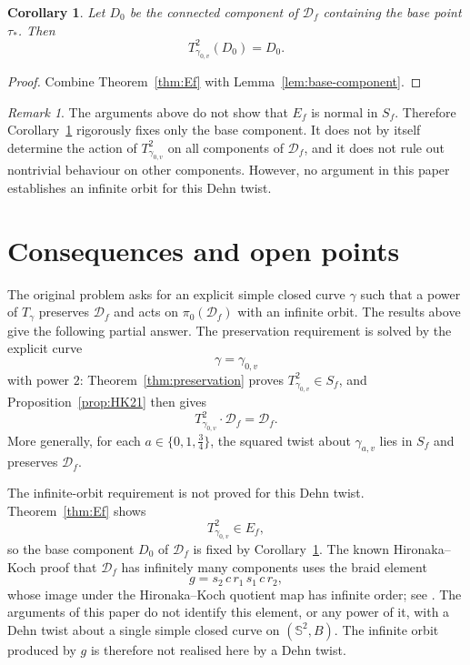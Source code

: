 \documentclass[12pt]{article}
\newtheorem{corollary}[theorem]{Corollary}
\theoremstyle{definition}
\theoremstyle{remark}
\newtheorem{remark}[theorem]{Remark}
\numberwithin{equation}{section}
\newcommand{\Sph}{\mathbb S}
\newcommand{\Df}{\mathcal D_f}
\newcommand{\Sf}{S_f}
\newcommand{\Ef}{E_f}
\begin{document}
\begin{corollary}
\label{cor:base-fixed}
Let $D_{0}$ be the connected component of $\Df$ containing the base
point $\tau_{*}$.  Then
\[
T_{\gamma_{0,v}}^{2}(D_{0})=D_{0}.
\]
\end{corollary}
\begin{proof}
Combine Theorem~\ref{thm:Ef} with Lemma~\ref{lem:base-component}.
\end{proof}

\begin{remark}
\label{rem:caveat}
The arguments above do not show that $\Ef$ is normal in $\Sf$.
Therefore Corollary~\ref{cor:base-fixed} rigorously fixes only the
base component.  It does not by itself determine the action of
$T_{\gamma_{0,v}}^{2}$ on all components of $\Df$, and it does not rule
out nontrivial behaviour on other components.  However, no argument in
this paper establishes an infinite orbit for this Dehn twist.
\end{remark}

\section{Consequences and open points}
\label{sec:open}

The original problem asks for an explicit simple closed curve $\gamma$
such that a power of $T_{\gamma}$ preserves $\Df$ and acts on
$\pi_{0}(\Df)$ with an infinite orbit.  The results above give the
following partial answer.
The preservation requirement is solved by the explicit curve
\[
\gamma=\gamma_{0,v}
\]
with power $2$: Theorem~\ref{thm:preservation} proves
$T_{\gamma_{0,v}}^{2}\in\Sf$, and Proposition~\ref{prop:HK21} then gives
\[
T_{\gamma_{0,v}}^{2}\cdot\Df=\Df.
\]
More generally, for each $a\in\{0,1,\tfrac34\}$, the squared twist about
$\gamma_{a,v}$ lies in $\Sf$ and preserves $\Df$.

The infinite-orbit requirement is not proved for this Dehn twist.
Theorem~\ref{thm:Ef} shows
\[
T_{\gamma_{0,v}}^{2}\in\Ef,
\]
so the base component $D_{0}$ of $\Df$ is fixed by
Corollary~\ref{cor:base-fixed}.  The known Hironaka--Koch proof that
$\Df$ has infinitely many components uses the braid element
\[
g=s_{2}\,c\,r_{1}\,s_{1}\,c\,r_{2},
\]
whose image under the Hironaka--Koch quotient map has infinite order;
see \cite[Theorem~1.3 and Remark~4.7]{HK}.  The arguments of this paper
do not identify this element, or any power of it, with a Dehn twist
about a single simple closed curve on $(\Sph^{2},B)$.  The infinite
orbit produced by $g$ is therefore not realised here by a Dehn twist.
\end{document}
